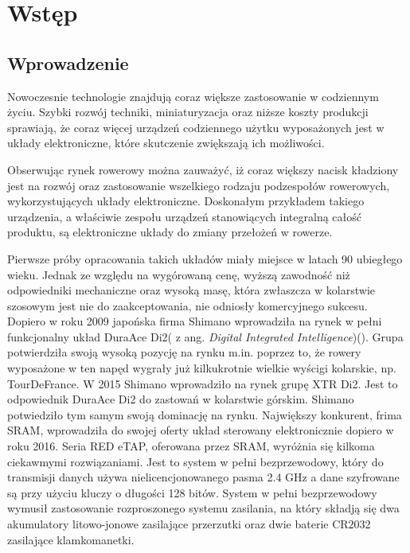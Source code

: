 \chapter{Wstęp}
\label{cha:Wstęp}

\section{Wprowadzenie}
\label{sec:Wprowadzenie}
Nowoczesnie technologie znajdują coraz większe zastosowanie w codziennym życiu. Szybki rozwój techniki, miniaturyzacja oraz niższe koszty produkcji sprawiają, że coraz więcej urządzeń codziennego użytku wyposażonych jest w układy elektroniczne, które skutczenie zwiększają ich możliwości. 

Obserwując rynek rowerowy można zauważyć, iż coraz większy nacisk kładziony jest na rozwój oraz zastosowanie wszelkiego rodzaju podzespołów rowerowych, wykorzystujących układy elektroniczne. Doskonałym przykładem takiego urządzenia, a właściwie zespołu urządzeń stanowiących integralną całość produktu, są elektroniczne układy do zmiany przełożeń w rowerze.

Pierwsze próby opracowania takich układów miały miejsce w latach 90 ubiegłego wieku. Jednak ze względu na wygórowaną cenę, wyższą zawodność niż odpowiedniki mechaniczne oraz wysoką masę, która zwłaszcza w kolarstwie szosowym jest nie do zaakceptowania, nie odniosły komercyjnego sukcesu. Dopiero w roku 2009 japońska firma Shimano wprowadziła na rynek w pełni funkcjonalny układ DuraAce Di2( z ang. {\em Digital Integrated Intelligence})(\cite{Dil00}). Grupa potwierdziła swoją wysoką pozycję na rynku m.in. poprzez to, że rowery wyposażone w ten napęd wygrały już kilkukrotnie wielkie wyścigi kolarskie, np. TourDeFrance. W 2015 Shimano wprowadziło na rynek grupę XTR Di2. Jest to odpowiednik DuraAce Di2 do zastowań w kolarstwie górskim. Shimano potwiedziło tym samym swoją dominację na rynku. Największy konkurent, frima SRAM, wprowadziła do swojej oferty układ sterowany elektronicznie dopiero w roku 2016. Seria RED eTAP, oferowana przez SRAM, wyróżnia się kilkoma ciekawmymi rozwiązaniami. Jest to system w pełni bezprzewodowy, który do transmisji danych używa nielicencjonowanego pasma 2.4 GHz a dane szyfrowane są przy użyciu kluczy o długości 128 bitów. System w pełni bezprzewodowy wymusił zastosowanie rozproszonego systemu zasilania, na który składją się dwa akumulatory litowo-jonowe zasilające przerzutki oraz dwie baterie CR2032 zasilające klamkomanetki\cite{bikeWorld.pl}.


